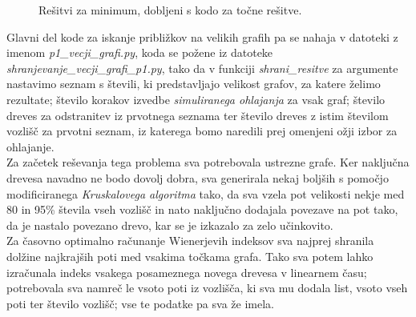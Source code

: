 \documentclass[a4paper, 12 pt]{article}
\begin{document}
\begin{figure}[H]
    \centering
    \qquad
    \caption{Rešitvi za minimum, dobljeni s kodo za točne rešitve.}
    \label{p1min}
\end{figure}

\pagebreak

Glavni del kode za iskanje približkov na velikih grafih pa se nahaja v datoteki z imenom \textit{p1\_vecji\_grafi.py}, koda se požene iz datoteke \textit{shranjevanje\_vecji\_grafi\_p1.py}, tako da v funkciji \textit{shrani\_resitve} za argumente nastavimo seznam s števili, ki predstavljajo velikost grafov, za katere želimo rezultate; število korakov izvedbe \textit{simuliranega ohlajanja} za vsak graf; število dreves za odstranitev iz prvotnega seznama ter število dreves z istim številom vozlišč za prvotni seznam, iz katerega bomo naredili prej omenjeni ožji izbor za ohlajanje.\\

Za začetek reševanja tega problema sva potrebovala ustrezne grafe. Ker naključna drevesa navadno ne bodo dovolj dobra, sva generirala nekaj boljših s pomočjo modificiranega \textit{Kruskalovega algoritma} tako, da sva vzela pot velikosti nekje med 80 in 95\% števila vseh vozlišč in nato naključno dodajala povezave na pot tako, da je nastalo povezano drevo, kar se je izkazalo za zelo učinkovito.\\

Za časovno optimalno računanje Wienerjevih indeksov sva najprej shranila dolžine najkrajših poti med vsakima točkama grafa. Tako sva potem lahko izračunala indeks vsakega posameznega novega drevesa v linearnem času; potrebovala sva namreč le vsoto poti iz vozlišča, ki sva mu dodala list, vsoto vseh poti ter število vozlišč; vse te podatke pa sva že imela. \\
\end{document}
